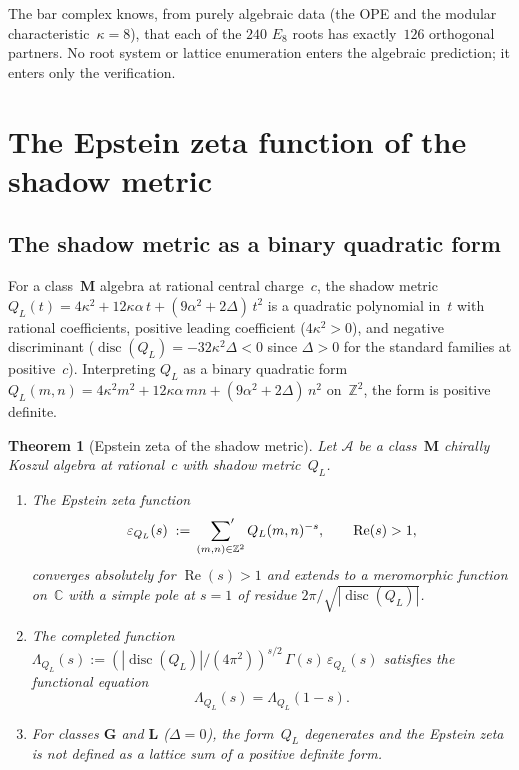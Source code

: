 \documentclass[11pt,reqno]{amsart}
\newtheorem{theorem}{Theorem}[section]
\theoremstyle{definition}
\theoremstyle{remark}
\newcommand{\cA}{\mathcal{A}}
\numberwithin{equation}{section}
\begin{document}
The bar complex knows, from purely algebraic data (the OPE
and the modular characteristic~$\kappa = 8$), that each of the
$240$ $E_8$ roots has exactly~$126$ orthogonal partners. No
root system or lattice enumeration enters the algebraic
prediction; it enters only the verification.



\section{The Epstein zeta function of the shadow metric}
\label{sec:epstein}

\subsection{The shadow metric as a binary quadratic form}

For a class~$\mathbf{M}$ algebra at rational central charge~$c$,
the shadow metric
$Q_L(t) = 4\kappa^2 + 12\kappa\alpha\,t
+ (9\alpha^2 + 2\Delta)\,t^2$
is a quadratic polynomial in~$t$ with rational coefficients,
positive leading coefficient ($4\kappa^2 > 0$), and negative
discriminant ($\operatorname{disc}(Q_L) = -32\kappa^2\Delta < 0$
since $\Delta > 0$ for the standard families at positive~$c$).
Interpreting $Q_L$ as a binary quadratic form
$Q_L(m, n) = 4\kappa^2 m^2 + 12\kappa\alpha\, mn
+ (9\alpha^2 + 2\Delta)\, n^2$
on~$\mathbb{Z}^2$, the form is positive definite.

\begin{theorem}[Epstein zeta of the shadow metric]
\label{thm:shadow-epstein}
Let $\cA$ be a class~$\mathbf{M}$ chirally Koszul algebra
at rational~$c$ with shadow metric~$Q_L$.
\begin{enumerate}[label=\textup{(\roman*)}]
\item The \emph{Epstein zeta function}
\begin{equation}\label{eq:shadow-epstein}
 \varepsilon_{Q_L}(s)
 \;:=\;
 \sideset{}{'}\sum_{(m,n) \in \mathbb{Z}^2}
 Q_L(m,n)^{-s},
 \qquad
 \operatorname{Re}(s) > 1,
\end{equation}
converges absolutely for $\operatorname{Re}(s) > 1$ and
extends to a meromorphic function on~$\mathbb{C}$ with a
simple pole at $s = 1$ of residue
$2\pi/\sqrt{|\operatorname{disc}(Q_L)|}$.

\item The completed function
$\Lambda_{Q_L}(s)
:= (|\operatorname{disc}(Q_L)|/(4\pi^2))^{s/2}\,
\Gamma(s)\,\varepsilon_{Q_L}(s)$
satisfies the functional equation
\begin{equation}\label{eq:shadow-fe}
 \Lambda_{Q_L}(s) = \Lambda_{Q_L}(1 - s).
\end{equation}

\item For classes $\mathbf{G}$ and $\mathbf{L}$
\textup{(}$\Delta = 0$\textup{)}, the form~$Q_L$ degenerates
and the Epstein zeta is not defined as a lattice sum of a
positive definite form.
\end{enumerate}
\end{theorem}
\end{document}
